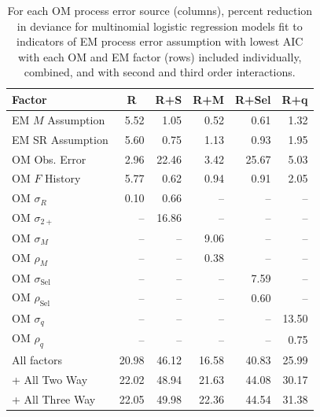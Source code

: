\documentclass[
  12pt,
]{article}
\begin{document}
\begin{table}
\caption{For each OM process error source (columns), percent reduction in deviance for multinomial logistic regression models fit to indicators of EM process error assumption with lowest AIC with each OM and EM factor (rows) included individually, combined, and with second and third order interactions.}\label{AIC_PE_PRD_table}
{\begin{center}
\begin{tabular}{lrrrrr}
\hline\hline
\multicolumn{1}{l}{Factor}&\multicolumn{1}{c}{R}&\multicolumn{1}{c}{R+S}&\multicolumn{1}{c}{R+M}&\multicolumn{1}{c}{R+Sel}&\multicolumn{1}{c}{R+q}\tabularnewline
\hline
EM $M$ Assumption& 5.52& 1.05& 0.52& 0.61& 1.32\tabularnewline
EM SR Assumption& 5.60& 0.75& 1.13& 0.93& 1.95\tabularnewline
OM Obs. Error& 2.96&22.46& 3.42&25.67& 5.03\tabularnewline
OM $F$ History& 5.77& 0.62& 0.94& 0.91& 2.05\tabularnewline
OM $\sigma_R$& 0.10& 0.66&--&--&--\tabularnewline
OM $\sigma_{2+}$ &--&16.86&--&--&--\tabularnewline
OM $\sigma_M$&--&--& 9.06&--&--\tabularnewline
OM $\rho_M$&--&--& 0.38&--&--\tabularnewline
OM $\sigma_{\text{Sel}}$&--&--&--& 7.59&--\tabularnewline
OM $\rho_{\text{Sel}}$&--&--&--& 0.60&--\tabularnewline
OM $\sigma_q$&--&--&--&--&13.50\tabularnewline
OM $\rho_q$&--&--&--&--& 0.75\tabularnewline
All factors&20.98&46.12&16.58&40.83&25.99\tabularnewline
+ All Two Way&22.02&48.94&21.63&44.08&30.17\tabularnewline
+ All Three Way&22.05&49.98&22.36&44.54&31.38\tabularnewline
\hline
\end{tabular}\end{center}
}
\end{table}
\end{document}
